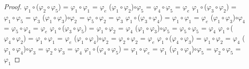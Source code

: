 \documentclass[10pt,a4paper,oneside]{article}
\begin{document}
\begin{proof}
					$\varphi_{1}\circ$($\varphi_{2}\circ\varphi_{5}$) = $\varphi_{1}\circ\varphi_{1}$ = $\varphi_{e}$
					\newline
					($\varphi_{1}\circ\varphi_{2}$)$\circ\varphi_{5}$ = $\varphi_{4}\circ\varphi_{5}$ = $\varphi_{e}$
					\newline
					\newline
					$\varphi_{1}\circ$($\varphi_{3}\circ\varphi_{2}$) = $\varphi_{1}\circ\varphi_{5}$ = $\varphi_{3}$
					\newline
					($\varphi_{1}\circ\varphi_{3}$)$\circ\varphi_{2}$ = $\varphi_{5}\circ\varphi_{2}$ = $\varphi_{3}$
					\newline
					\newline
					$\varphi_{1}\circ$($\varphi_{3}\circ\varphi_{4}$) = $\varphi_{1}\circ\varphi_{1}$ = $\varphi_{e}$
					\newline
					($\varphi_{1}\circ\varphi_{3}$)$\circ\varphi_{4}$ = $\varphi_{5}\circ\varphi_{4}$ = $\varphi_{e}$
					\newline
					\newline
					$\varphi_{1}\circ$($\varphi_{3}\circ\varphi_{5}$) = $\varphi_{1}\circ\varphi_{2}$ = $\varphi_{4}$
					\newline
					($\varphi_{1}\circ\varphi_{3}$)$\circ\varphi_{5}$ = $\varphi_{5}\circ\varphi_{5}$ = $\varphi_{4}$
					\newline
					\newline
					$\varphi_{1}\circ$($\varphi_{4}\circ\varphi_{2}$) = $\varphi_{1}\circ\varphi_{1}$ = $\varphi_{e}$
					\newline
					($\varphi_{1}\circ\varphi_{4}$)$\circ\varphi_{2}$ = $\varphi_{2}\circ\varphi_{2}$ = $\varphi_{e}$
					\newline
					\newline
					$\varphi_{1}\circ$($\varphi_{4}\circ\varphi_{3}$) = $\varphi_{1}\circ\varphi_{2}$ = $\varphi_{4}$
					\newline
					($\varphi_{1}\circ\varphi_{4}$)$\circ\varphi_{3}$ = $\varphi_{2}\circ\varphi_{3}$ = $\varphi_{4}$
					\newline
					\newline
					$\varphi_{1}\circ$($\varphi_{4}\circ\varphi_{5}$) = $\varphi_{1}\circ\varphi_{e}$ = $\varphi_{1}$
					\newline
					($\varphi_{1}\circ\varphi_{4}$)$\circ\varphi_{5}$ = $\varphi_{2}\circ\varphi_{5}$ = $\varphi_{1}$
					\newline
					\newline

\end{proof}
\end{document}
